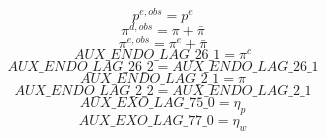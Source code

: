 \begin{dmath}
{{p^{e,obs}}}={{p^{e}}}
\end{dmath}
\begin{dmath}
{{\pi^{d,obs}}}={{\pi}}+{{\bar{\pi}}}
\end{dmath}
\begin{dmath}
{{\pi^{e,obs}}}={{\pi^{e}}}+{{\bar{\pi}}}
\end{dmath}
\begin{dmath}
{AUX\_ENDO\_LAG\_26\_1}={{\pi^{c}}}
\end{dmath}
\begin{dmath}
{AUX\_ENDO\_LAG\_26\_2}={AUX\_ENDO\_LAG\_26\_1}
\end{dmath}
\begin{dmath}
{AUX\_ENDO\_LAG\_2\_1}={{\pi}}
\end{dmath}
\begin{dmath}
{AUX\_ENDO\_LAG\_2\_2}={AUX\_ENDO\_LAG\_2\_1}
\end{dmath}
\begin{dmath}
{AUX\_EXO\_LAG\_75\_0}={{\eta_{p}}}
\end{dmath}
\begin{dmath}
{AUX\_EXO\_LAG\_77\_0}={{\eta_{w}}}
\end{dmath}
